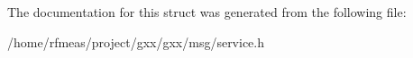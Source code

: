 \begin{DoxyCompactItemize}
\begin{tabbing}
\end{tabbing}\end{DoxyCompactItemize}


The documentation for this struct was generated from the following file\+:\begin{DoxyCompactItemize}
\item 
/home/rfmeas/project/gxx/gxx/msg/service.\+h\end{DoxyCompactItemize}
